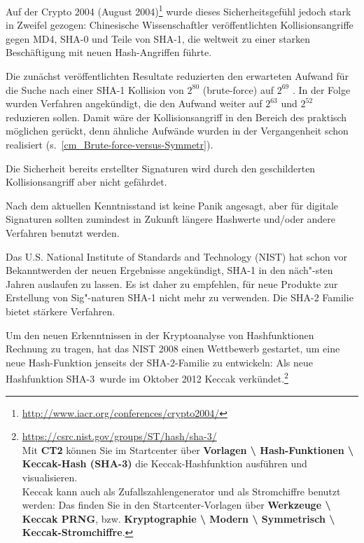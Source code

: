 \begin{refsegment}
Auf der Crypto 2004 (August 2004)\footnote{%
    \url{http://www.iacr.org/conferences/crypto2004/} }
wurde dieses Sicherheitsgefühl jedoch stark in Zweifel gezogen:
Chinesische Wissenschaftler veröffentlichten
Kollisionsangriffe gegen MD4, SHA-0 und Teile von SHA-1, die
weltweit zu einer starken Beschäftigung mit neuen Hash-Angriffen
führte.

Die zunächst veröffentlichten Resultate reduzierten den erwarteten Aufwand für
die Suche nach einer SHA-1 Kollision von $2^{80}$ (brute-force) auf $2^{69}$
\cite{Wang2005}.  In der Folge wurden Verfahren angekündigt, die den Aufwand
weiter auf $2^{63}$ \cite{Wang2005b} und $2^{52}$ \cite{McDonald2009} reduzieren
sollen.  Damit wäre der Kollisionsangriff in den Bereich des praktisch möglichen
gerückt, denn ähnliche Aufwände wurden in der Vergangenheit schon realisiert (s.\
\ref{cm_Brute-force-versus-Symmetr}).

Die Sicherheit bereits erstellter Signaturen wird durch den geschilderten
Kollisionsangriff aber nicht gefährdet.

Nach dem aktuellen Kenntnisstand ist keine Panik angesagt, aber für
digitale Signaturen sollten zumindest in Zukunft längere Hashwerte und/oder
andere Verfahren benutzt werden.

Das U.S. National Institute of Standards and Technology (NIST) hat
schon vor Bekanntwerden der neuen Ergebnisse angekündigt, SHA-1 in den
näch"-sten Jahren auslaufen zu lassen. Es ist daher zu empfehlen, für neue
Produkte zur Erstellung von Sig"-naturen SHA-1 nicht mehr zu verwenden. Die
SHA-2 Familie \cite{FIPS180} bietet stärkere Verfahren.

Um den neuen Erkenntnissen in der Kryptoanalyse von Hashfunktionen Rechnung
zu tragen, hat das NIST 2008 einen Wettbewerb gestartet, um eine neue
Hash-Funktion jenseits der SHA-2-Familie zu entwickeln: Als neue Hashfunktion
\glqq SHA-3\grqq~wurde im Oktober 2012 Keccak\index{Keccak}\index{SHA-3}
verkündet.\footnote{%
\url{https://csrc.nist.gov/groups/ST/hash/sha-3/}\\
    Mit \textbf{CT2} können Sie im Startcenter
    über \textbf{Vorlagen \textbackslash{} Hash-Funktionen \textbackslash{}
    Keccak-Hash (SHA-3)} die Keccak-Hashfunktion ausführen und visualisieren.\\
    Keccak kann auch als Zufallszahlengenerator und als Stromchiffre benutzt
    werden: Das finden Sie in den Startcenter-Vorlagen über
    \textbf{Werkzeuge \textbackslash{} Keccak PRNG}, bzw.
    \textbf{Kryptographie \textbackslash{} Modern \textbackslash{} Symmetrisch
         \textbackslash{} Keccak-Stromchiffre}.
}


\end{refsegment}
